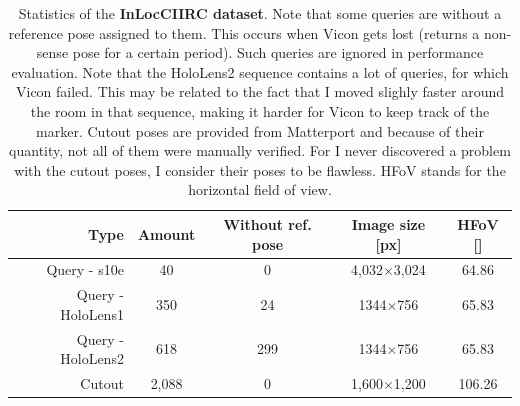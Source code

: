 \documentclass[twoside]{ctuthesis}
\theoremstyle{plain}
\theoremstyle{definition}
\theoremstyle{note}
\begin{document}
\begin{table}[t]
    \centering
    {\footnotesize
	\begin{tabular}{|r||c|c|c|c|}
	\hline
	Type & Amount & Without ref. pose & Image size [px] & HFoV [\degree] \\[1pt]
	\hline
    Query - s10e & 40 & 0 & 4,032$\times$3,024 & 64.86 \\[1pt]
    Query - HoloLens1 & 350 & 24 & 1344$\times$756 & 65.83 \\[1pt]
    Query - HoloLens2 & 618 & 299 & 1344$\times$756 & 65.83 \\[1pt]
	Cutout & 2,088 & 0 & 1,600$\times$1,200 & 106.26 \\[3pt]
	\hline
    \end{tabular}
	\caption{Statistics of the {\bf InLocCIIRC dataset}. Note that some queries are without a reference pose assigned to them. This occurs when Vicon gets lost (returns a non-sense pose for a certain period). Such queries are ignored in performance evaluation. Note that the HoloLens2 sequence contains a lot of queries, for which Vicon failed. This may be related to the fact that I moved slighly faster around the room in that sequence, making it harder for Vicon to keep track of the marker. Cutout poses are provided from Matterport and because of their quantity, not all of them were manually verified. For I never discovered a problem with the cutout poses, I consider their poses to be flawless. HFoV stands for the horizontal field of view.}
	\label{tab:dataset-statistics}
    }
\end{table}
\end{document}

